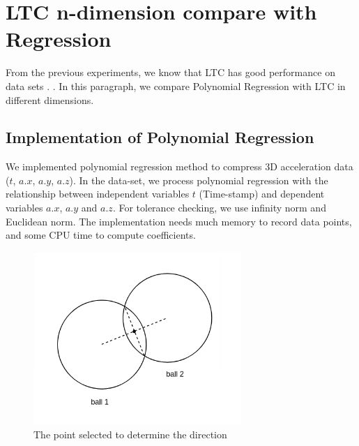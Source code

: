 \section{LTC n-dimension compare with Regression}

From the previous experiments, we know that LTC has good performance on 
data sets . . In this
paragraph, we compare Polynomial Regression  with LTC in different dimensions. 


\subsection{Implementation of Polynomial Regression}

We implemented polynomial regression method to compress 3D acceleration data
($t$, $a.x$, $a.y$, $a.z$). In the data-set, we process polynomial regression
with the relationship between independent variables $t$ (Time-stamp) and dependent
variables $a.x$, $a.y$ and $a.z$. For tolerance checking, we use infinity norm
and Euclidean norm. The implementation needs much memory to record data points,
and some CPU time to compute coefficients. 

\begin{figure}
  \centering
\includegraphics[width=0.7\textwidth]{figures/point-in-chord.png}
\caption{The point selected to determine the direction}
\label{fig:compare_point}
\end{figure}

